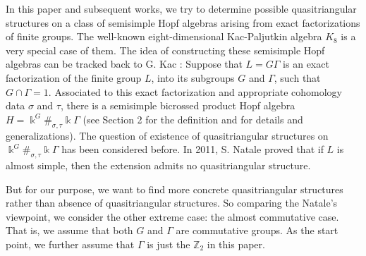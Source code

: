 \documentclass[a4paper,11pt]{amsart}
\def \Z{\mathbb{Z}}
\def \Z{\mathbb{Z}}
\numberwithin{equation}{section}
\begin{document}
In this paper and subsequent works, we try to determine possible quasitriangular structures on a class of semisimple Hopf algebras arising from exact factorizations of
finite groups. The well-known eight-dimensional Kac-Paljutkin algebra $K_8$ is a very special case of them.  The idea of constructing these semisimple Hopf algebras can be tracked back to G. Kac \cite{Kac}: Suppose that $L= G\Gamma$ is an exact factorization of the finite group $L$, into its subgroups $G$ and $\Gamma$, such that $G\cap \Gamma = 1.$ Associated to this exact factorization and appropriate cohomology data $\sigma$ and
$\tau$, there is a semisimple bicrossed product Hopf algebra $H =\Bbbk^G\#_{\sigma,\tau}\Bbbk \Gamma$ (see Section 2 for the definition and \cite{M3,M5,M6} for details and generalizations). The question of existence of quasitriangular structures on $\Bbbk^G\#_{\sigma,\tau}\Bbbk \Gamma$ has been considered before. In 2011, S. Natale \cite{Na} proved that if $L$ is almost simple, then the extension admits no quasitriangular structure.

But for our purpose, we want to find more concrete quasitriangular structures rather than absence of quasitriangular structures. So comparing the Natale's viewpoint, we consider the other extreme case: the almost commutative case. That is, we assume that both $G$ and $\Gamma$ are commutative groups. As the start point, we further assume that $\Gamma$ is just the $\Z_2$ in this paper.

\end{document}
